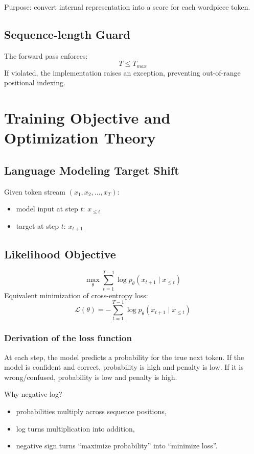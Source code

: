 \documentclass[a4paper,11pt]{article}
\begin{document}
Purpose: convert internal representation into a score for each wordpiece token.

\subsection{Sequence-length Guard}
The forward pass enforces:
\[
T \leq T_{max}
\]
If violated, the implementation raises an exception, preventing out-of-range positional indexing.

\section{Training Objective and Optimization Theory}
\subsection{Language Modeling Target Shift}
Given token stream $(x_1, x_2, \ldots, x_T)$:
\begin{itemize}[leftmargin=1.5em]
    \item model input at step $t$: $x_{\le t}$
    \item target at step $t$: $x_{t+1}$
\end{itemize}

\subsection{Likelihood Objective}
\[
\max_\theta \sum_{t=1}^{T-1} \log p_\theta(x_{t+1}\mid x_{\le t})
\]
Equivalent minimization of cross-entropy loss:
\[
\mathcal{L}(\theta) = -\sum_{t=1}^{T-1}\log p_\theta(x_{t+1}\mid x_{\le t})
\]

\subsubsection{Derivation of the loss function}
At each step, the model predicts a probability for the true next token.
If the model is confident and correct, probability is high and penalty is low.
If it is wrong/confused, probability is low and penalty is high.

Why negative log?
\begin{itemize}[leftmargin=1.5em]
    \item probabilities multiply across sequence positions,
    \item log turns multiplication into addition,
    \item negative sign turns ``maximize probability'' into ``minimize loss''.
\end{itemize}
\end{document}
